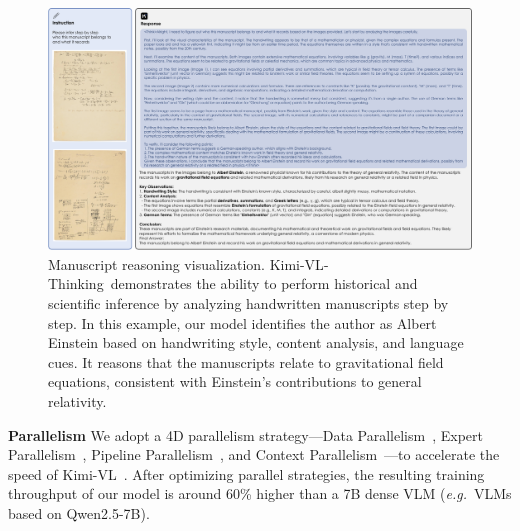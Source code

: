 \documentclass{article}
\newcommand{\ourname}{{Kimi-VL}}
\newcommand{\ourreasoningname}{{\ourname-Thinking}}
\newcommand{\citep}[1]{\parencite{#1}}
\begin{document}
\begin{figure}
    \centering
    \includegraphics[width=1.0\linewidth]{figures/case_reasoning.pdf}
    \caption{Manuscript reasoning visualization. \ourreasoningname~demonstrates the ability to perform historical and scientific inference by analyzing handwritten manuscripts step by step. In this example, our model identifies the author as Albert Einstein based on handwriting style, content analysis, and language cues. It reasons that the manuscripts relate to gravitational field equations, consistent with Einstein’s contributions to general relativity.}
    \label{fig:outline}
\end{figure}


\textbf{Parallelism} We adopt a 4D parallelism strategy—{Data Parallelism}~\citep{li2020pytorchdistributedexperiencesaccelerating}, 
{Expert Parallelism}~\citep{fedus2022switchtransformersscalingtrillion}, 
{Pipeline Parallelism}~\citep{huang2019gpipeefficienttraininggiant,narayanan2021efficientlargescalelanguagemodel}, 
and {Context Parallelism}~\citep{jacobs2023deepspeedulyssesoptimizationsenabling,liu2023ringattentionblockwisetransformers}—to accelerate the speed of {\ourname~}. After optimizing parallel strategies, the resulting training throughput of our model is around 60\% higher than a 7B dense VLM (\textit{e.g.}~VLMs based on Qwen2.5-7B).
\end{document}
